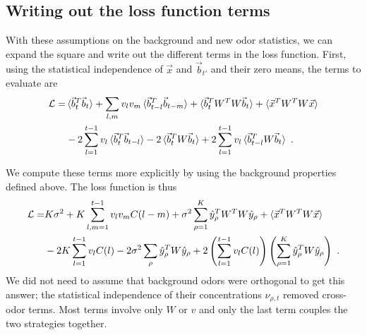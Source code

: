 \documentclass[letter, 12pt]{article}
\begin{document}
 \subsection{Writing out the loss function terms}
With these assumptions on the background and new odor statistics, we can expand the square and write out the different terms in the loss function. First, using the statistical independence of $\vec{x}$ and $\vec{b}_{t'}$ and their zero means, the terms to evaluate are
 \begin{align*}
 	\mathcal{L} =&  \braket{{\vec{b}_t}^T \vec{b}_t} + \sum_{l, m} v_l v_m \braket{{\vec{b}_{t-l}}^T \vec{b}_{t-m}} +  \braket{ {\vec{b}_t}^T W^T W \vec{b}_t} + \braket{{\vec{x}}^T W^T W \vec{x}} \nonumber \\
		& -2 \sum_{l=1}^{t-1} v_l \braket{{\vec{b}_t}^T \vec{b}_{t-l}} - 2 \braket{{\vec{b}_t}^T W \vec{b}_t} + 2 \sum_{l=1}^{t-1} v_l \braket{{\vec{b}_{t-l}}^T W \vec{b}_t}  \nonumber \,\, .
 \end{align*}
 
We compute these terms more explicitly by using the background properties defined above. The loss function is thus
\begin{align}
\mathcal{L} =& K \sigma^2 + K \sum_{l, m=1}^{t-1} v_l v_m C(l-m) + \sigma^2 \sum_{\rho=1}^K \hat{y}_{\rho}^T W^T W \hat{y}_{\rho} + \braket{\vec{x}^T W^T W \vec{x}} \nonumber \\
 &-2 K \sum_{l=1}^{t-1} v_l C(l) - 2 \sigma^2 \sum_{\rho} \hat{y}_{\rho}^T W \hat{y}_{\rho} + 2 \left(\sum_{l=1}^{t-1} v_l C(l) \right) \left(\sum_{\rho=1}^K \hat{y}_{\rho}^T W \hat{y}_{\rho} \right) 
 \,\, .
\label{eq:loss_function}
\end{align}
We did not need to assume that background odors were orthogonal to get this answer; the statistical independence of their concentrations $\nu_{\rho, t}$ removed cross-odor terms. Most terms involve only $W$ or $v$ and only the last term couples the two strategies together. 
\end{document}
